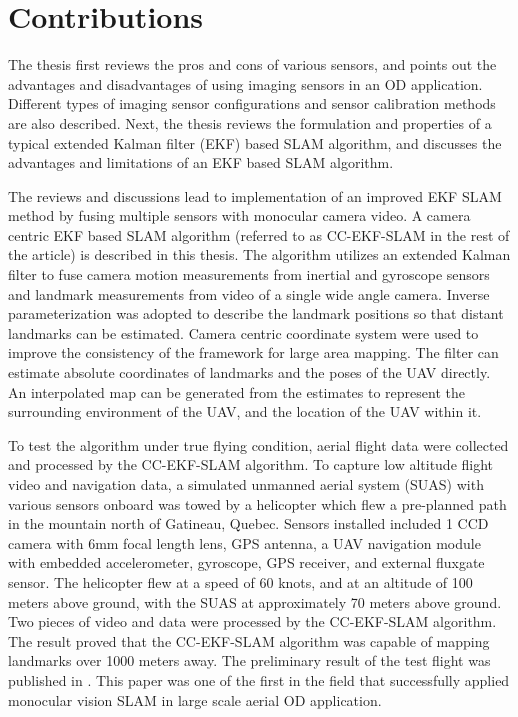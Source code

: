 \section{Contributions}\label{section:Contribution}
The thesis first reviews the pros and cons of various sensors, and
points out the advantages and disadvantages of using imaging sensors in
an OD application. Different types of imaging sensor configurations and
sensor calibration methods are also described. Next, the thesis
reviews the formulation and properties of a typical extended Kalman
filter (EKF) based SLAM algorithm, and discusses the advantages and
limitations of an EKF based SLAM algorithm.

The reviews and discussions lead to implementation of an improved EKF
SLAM method by fusing multiple sensors with monocular camera video.
A camera centric EKF based SLAM algorithm (referred to as CC-EKF-SLAM
in the rest of the article) is described in this thesis. The
algorithm utilizes an extended Kalman filter to fuse camera motion
measurements from inertial and gyroscope sensors and landmark
measurements from video of a single wide angle camera. Inverse
parameterization was adopted to describe the landmark positions so
that distant landmarks can be estimated. Camera centric coordinate system
were used to improve the consistency of the framework for large area
mapping. The filter can estimate absolute coordinates of landmarks and
the poses of the UAV directly. An interpolated map can be generated
from the estimates to represent the surrounding environment of the
UAV, and the location of the UAV within it.

To test the algorithm under true flying condition, aerial flight data
were collected and processed by the CC-EKF-SLAM algorithm. To capture
low altitude flight video and navigation data, a simulated unmanned
aerial system (SUAS) with various sensors onboard was towed by a
helicopter which flew a pre-planned path in the mountain north of
Gatineau, Quebec. Sensors installed included 1 CCD camera with 6mm
focal length lens, GPS antenna, a UAV navigation module with embedded
accelerometer, gyroscope, GPS receiver, and external fluxgate sensor.
The helicopter flew at a speed of 60 knots, and at an altitude of 100
meters above ground, with the SUAS at approximately 70 meters above
ground. Two pieces of video and data were processed by the CC-EKF-SLAM
algorithm. The result proved that the CC-EKF-SLAM algorithm was
capable of mapping landmarks over 1000 meters away. The preliminary
result of the test flight was published in \cite{zhang_obstacle_2012}.
This paper was one of the first in the field that successfully applied
monocular vision SLAM in large scale aerial OD application.

